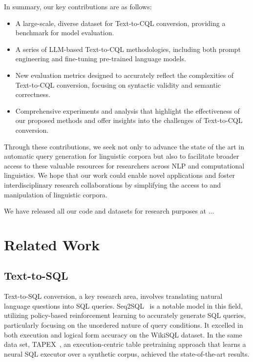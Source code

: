 \documentclass[11pt]{article}
\begin{document}
\begin{CJK*}{UTF8}{gbsn}
In summary, our key contributions are as follows:
\begin{itemize}
    \item A large-scale, diverse dataset for Text-to-CQL conversion, providing a benchmark for model evaluation.
    \item A series of LLM-based Text-to-CQL methodologies, including both prompt engineering and fine-tuning pre-trained language models.
    \item New evaluation metrics designed to accurately reflect the complexities of Text-to-CQL conversion, focusing on syntactic validity and semantic correctness.
    \item Comprehensive experiments and analysis that highlight the effectiveness of our proposed methods and offer insights into the challenges of Text-to-CQL conversion.
\end{itemize}

Through these contributions, we seek not only to advance the state of the art in automatic query generation for linguistic corpora but also to facilitate broader access to these valuable resources for researchers across NLP and computational linguistics. We hope that our work could enable novel applications and foster interdisciplinary research collaborations by simplifying the access to and manipulation of linguistic corpora.

We have released all our code and datasets for research purposes at ...


\section{Related Work}
\label{sec:related_work}

\subsection{Text-to-SQL}
\label{sec:text2sql}

Text-to-SQL conversion, a key research area, involves translating natural language questions into SQL queries. 
Seq2SQL~\citep{zhong2017seq2sql} is a notable model in this field, utilizing policy-based reinforcement learning to accurately generate SQL queries, particularly focusing on the unordered nature of query conditions. 
It excelled in both execution and logical form accuracy on the WikiSQL dataset.
In the same data set, TAPEX~\citep{liu2022tapex}, an execution-centric table pretraining approach that learns a neural SQL executor over a synthetic corpus, achieved the state-of-the-art results.


\end{CJK*}
\end{document}

